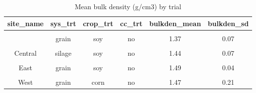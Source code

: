 \documentclass[
]{article}
\begin{document}
\begin{table}[H]

\caption{\label{tab:bulkden}Mean bulk density (g/cm3) by trial}
\centering
\begin{tabular}[t]{cccccc}
\toprule
site\_name & sys\_trt & crop\_trt & cc\_trt & bulkden\_mean & bulkden\_sd\\
\midrule
\cellcolor{gray!6}{Central} & \cellcolor{gray!6}{grain} & \cellcolor{gray!6}{soy} & \cellcolor{gray!6}{cc} & \cellcolor{gray!6}{1.42} & \cellcolor{gray!6}{0.08}\\
 & grain & soy & no & 1.37 & 0.07\\

\cellcolor{gray!6}{Central} & \cellcolor{gray!6}{silage} & \cellcolor{gray!6}{soy} & \cellcolor{gray!6}{cc} & \cellcolor{gray!6}{1.46} & \cellcolor{gray!6}{0.06}\\
\multirow{-4}{*}{\centering\arraybackslash Central} & silage & soy & no & 1.44 & 0.07\\
\cmidrule{1-6}
\cellcolor{gray!6}{East} & \cellcolor{gray!6}{grain} & \cellcolor{gray!6}{soy} & \cellcolor{gray!6}{cc} & \cellcolor{gray!6}{1.44} & \cellcolor{gray!6}{0.05}\\
\multirow{-2}{*}{\centering\arraybackslash East} & grain & soy & no & 1.49 & 0.04\\
\cmidrule{1-6}
\cellcolor{gray!6}{West} & \cellcolor{gray!6}{grain} & \cellcolor{gray!6}{corn} & \cellcolor{gray!6}{cc} & \cellcolor{gray!6}{1.57} & \cellcolor{gray!6}{0.14}\\
\multirow{-2}{*}{\centering\arraybackslash West} & grain & corn & no & 1.47 & 0.21\\
\bottomrule
\end{tabular}
\end{table}
\end{document}
